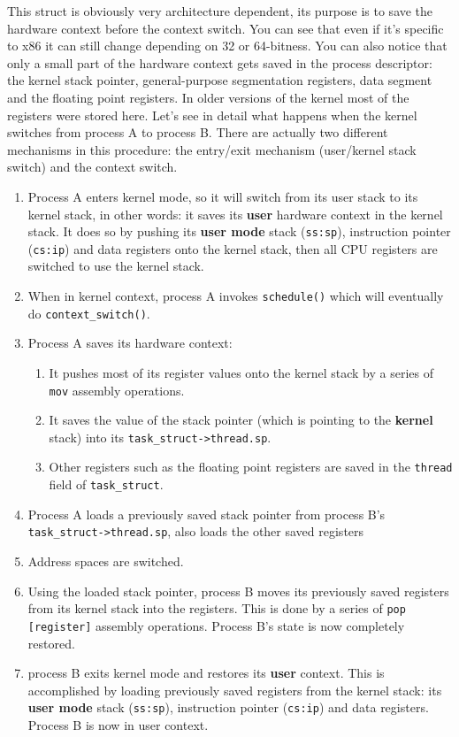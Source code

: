 This struct is obviously very architecture dependent, its purpose is to save the hardware context before the context switch. You can see that even if it's specific to x86 it can still change depending on 32 or 64-bitness. You can also notice that only a small part of the hardware context gets saved in the process descriptor: the kernel stack pointer, general-purpose segmentation registers, data segment and the floating point registers. In older versions of the kernel most of the registers were stored here.
Let's see in detail what happens when the kernel switches from process A to process B. There are actually two different mechanisms in this procedure: the entry/exit mechanism (user/kernel stack switch) and the context switch.
\begin{enumerate}
    \item Process A enters kernel mode, so it will switch from its user stack to its kernel stack, in other words: it saves its \textbf{user} hardware context in the kernel stack. It does so by pushing its \textbf{user mode} stack (\verb|ss:sp|), instruction pointer (\verb|cs:ip|) and data registers onto the kernel stack, then all CPU registers are switched to use the kernel stack.
    \item When in kernel context, process A invokes \verb|schedule()| which will eventually do \verb|context_switch()|.
    \item Process A saves its hardware context: 
    \begin{enumerate}
        \item It pushes most of its register values onto the kernel stack by a series of \verb|mov| assembly operations.
        \item It saves the value of the stack pointer (which is pointing to the \textbf{kernel} stack) into its \verb|task_struct->thread.sp|.
        \item Other registers such as the floating point registers are saved in the \verb|thread| field of \verb|task_struct|.
    \end{enumerate}
    \item Process A loads a previously saved stack pointer from process B's\\ \verb|task_struct->thread.sp|, also loads the other saved registers
    \item Address spaces are switched.
    \item Using the loaded stack pointer, process B moves its previously saved registers from its kernel stack into the registers. This is done by a series of \verb|pop [register]| assembly operations. Process B's state is now completely restored.
    \item process B exits kernel mode and restores its \textbf{user} context. This is accomplished by loading previously saved registers from the kernel stack: its \textbf{user mode} stack (\verb|ss:sp|), instruction pointer (\verb|cs:ip|) and data registers. Process B is now in user context.
\end{enumerate}

